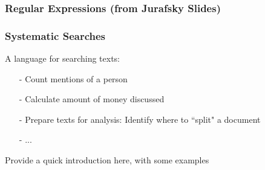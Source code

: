 \documentclass{beamer}
\numberwithin{equation}{section}
\begin{document}












\begin{frame}
\frametitle{Regular Expressions (from Jurafsky Slides) }

\begin{center}
\end{center}


\end{frame}


\begin{frame}
\frametitle{Systematic Searches}

A language for searching texts:
\begin{itemize}
\item[-] Count mentions of a person
\item[-] Calculate amount of money discussed
\item[-] Prepare texts for analysis: Identify where to ``split" a document
\item[-] ...
\end{itemize}

Provide a quick introduction here, with some examples

\end{frame}
\end{document}
